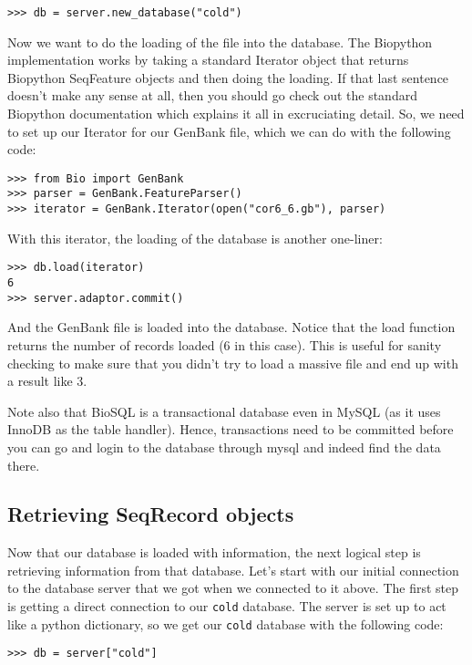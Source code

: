 \documentclass{article}
\begin{document}
\begin{verbatim}
>>> db = server.new_database("cold")
\end{verbatim}

Now we want to do the loading of the file into the database. The
Biopython implementation works by taking a standard Iterator object that
returns Biopython SeqFeature objects and then doing the loading. If that
last sentence doesn't make any sense at all, then you should go check
out the standard Biopython documentation which explains it all in
excruciating detail. So, we need to set up our Iterator for our GenBank
file, which we can do with the following code:

\begin{verbatim}
>>> from Bio import GenBank
>>> parser = GenBank.FeatureParser()
>>> iterator = GenBank.Iterator(open("cor6_6.gb"), parser)
\end{verbatim}

With this iterator, the loading of the database is another one-liner:

\begin{verbatim}
>>> db.load(iterator)
6
>>> server.adaptor.commit()
\end{verbatim}

And the GenBank file is loaded into the database. Notice that the load
function returns the number of records loaded (6 in this case). This is
useful for sanity checking to make sure that you didn't try to load a
massive file and end up with a result like 3.

Note also that BioSQL is a transactional database even in MySQL (as it
uses InnoDB as the table handler). Hence, transactions need to be
committed before you can go and login to the database through mysql
and indeed find the data there.

\subsection{Retrieving SeqRecord objects}

Now that our database is loaded with information, the next logical step
is retrieving information from that database. Let's start with our
initial connection to the database server that we got when we connected
to it above. The first step is getting a direct connection to our
\verb|cold| database. The server is set up to act like a python
dictionary, so we get our \verb|cold| database with the following code:

\begin{verbatim}
>>> db = server["cold"]
\end{verbatim}
\end{document}
